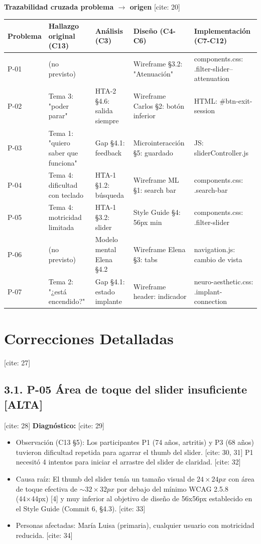 \documentclass{article}
\begin{document}
\textbf{Trazabilidad cruzada problema $\rightarrow$ origen} [cite: 20]

\begin{table}[h]
\centering
\begin{tabularx}{\textwidth}{lXXXX}
\toprule
\textbf{Problema} & \textbf{Hallazgo original (C13)} & \textbf{Análisis (C3)} & \textbf{Diseño (C4-C6)} & \textbf{Implementación (C7-C12)} \\ [cite: 21]
\midrule
P-01 & (no previsto) & & Wireframe §3.2: "Atenuación" & components.css: .filter-slider--attenuation \\ [cite: 21]
P-02 & Tema 3: "poder parar" & HTA-2 §4.6: salida siempre & Wireframe Carlos §2: botón inferior & HTML: \#btn-exit-session \\ [cite: 21]
P-03 & Tema 1: "quiero saber que funciona" & Gap §4.1: feedback & Microinteracción §5: guardado & JS: sliderController.js \\ [cite: 21]
P-04 & Tema 4: dificultad con teclado & HTA-1 §1.2: búsqueda & Wireframe ML §1: search bar & components.css: .search-bar \\ [cite: 21]
P-05 & Tema 4: motricidad limitada & HTA-1 §3.2: slider & Style Guide §4: 56px min & components.css: .filter-slider \\ [cite: 21]
P-06 & (no previsto) & Modelo mental Elena §4.2 & Wireframe Elena §3: tabs & navigation.js: cambio de vista \\ [cite: 21]
P-07 & Tema 2: "¿está encendido?" & Gap §4.1: estado implante & Wireframe header: indicador & neuro-aesthetic.css: .implant-connection \\ [cite: 22, 23, 24, 25, 26]
\bottomrule
\end{tabularx}
\end{table}

\section{Correcciones Detalladas} [cite: 27]

\subsection{3.1. P-05 Área de toque del slider insuficiente [ALTA]} [cite: 28]
\textbf{Diagnóstico:} [cite: 29]
\begin{itemize}
    \item Observación (C13 §5): Los participantes P1 (74 años, artritis) y P3 (68 años) tuvieron dificultad repetida para agarrar el thumb del slider. [cite: 30, 31] P1 necesitó 4 intentos para iniciar el arrastre del slider de claridad. [cite: 32]
    \item Causa raíz: El thumb del slider tenía un tamaño visual de $24\times24px$ con área de toque efectiva de $\sim32\times32px$ por debajo del mínimo WCAG 2.5.8 (44×44px) [4] y muy inferior al objetivo de diseño de 56x56px establecido en el Style Guide (Commit 6, §4.3). [cite: 33]
    \item Personas afectadas: María Luisa (primaria), cualquier usuario con motricidad reducida. [cite: 34]
\end{itemize}
\end{document}
